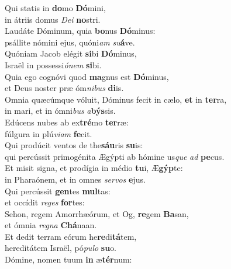 \evenverse Qui statis in \textbf{do}mo \textbf{Dó}mini,~\*\\
\evenverse in átriis domus \textit{De}\textit{i} \textbf{no}stri.\\
\oddverse Laudáte Dóminum, quia \textbf{bo}nus \textbf{Dó}minus:~\*\\
\oddverse psállite nómini ejus, quóni\textit{am} \textit{su}\textbf{á}ve.\\
\evenverse Quóniam Jacob elégit \textbf{si}bi \textbf{Dó}minus,~\*\\
\evenverse Israël in possessi\textit{ó}\textit{nem} \textbf{si}bi.\\
\oddverse Quia ego cognóvi quod \textbf{ma}gnus est \textbf{Dó}minus,~\*\\
\oddverse et Deus noster præ óm\textit{ni}\textit{bus} \textbf{di}is.\\
\evenverse Omnia quæcúmque vóluit, Dóminus fecit in cælo, \textbf{et} in \textbf{ter}ra,~\*\\
\evenverse in mari, et in ómni\textit{bus} \textit{a}\textbf{býs}sis.\\
\oddverse Edúcens nubes ab ex\textbf{tré}mo \textbf{ter}ræ:~\*\\
\oddverse fúlgura in plú\textit{vi}\textit{am} \textbf{fe}cit.\\
\evenverse Qui prodúcit ventos de the\textbf{sáu}ris \textbf{su}is:~\*\\
\evenverse qui percússit primogénita Ægýpti ab hómine us\textit{que} \textit{ad} \textbf{pe}cus.\\
\oddverse Et misit signa, et prodígia in médio \textbf{tu}i, Æ\textbf{gýp}te:~\*\\
\oddverse in Pharaónem, et in omnes \textit{ser}\textit{vos} \textbf{e}jus.\\
\evenverse Qui percússit \textbf{gen}tes \textbf{mul}tas:~\*\\
\evenverse et occídit \textit{re}\textit{ges} \textbf{for}tes:\\
\oddverse Sehon, regem Amorrhæórum, et Og, \textbf{re}gem \textbf{Ba}san,~\*\\
\oddverse et ómnia \textit{re}\textit{gna} \textbf{Chá}naan.\\
\evenverse Et dedit terram eórum he\textbf{re}di\textbf{tá}tem,~\*\\
\evenverse hereditátem Israël, pó\textit{pu}\textit{lo} \textbf{su}o.\\
\oddverse Dómine, nomen tuum \textbf{in} æ\textbf{tér}num:~\*\\
